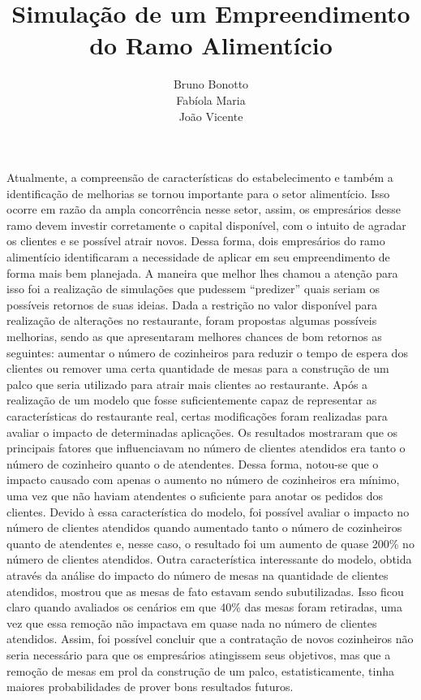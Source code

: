 \documentclass[pt,disc,oneside]{ufscpgeasthesis}
\institute         {}
\title             {Simulação de um Empreendimento do Ramo Alimentício}
\author            {Bruno Bonotto \\ Fabíola Maria \\ João Vicente}
\begin{document}
	\frontpage
	\presentationpage
	\tableofcontents

	\resumo

		Atualmente, a compreensão de características do estabelecimento e também a identificação de melhorias se tornou importante para o setor alimentício.
		Isso ocorre em razão da ampla concorrência nesse setor, assim, os empresários desse ramo devem investir corretamente o capital disponível, com o intuito de agradar os clientes e se possível atrair novos.
		Dessa forma, dois empresários do ramo alimentício identificaram a necessidade de aplicar em seu empreendimento de forma mais bem planejada.
		A maneira que melhor lhes chamou a atenção para isso foi a realização de simulações que pudessem ``predizer'' quais seriam os possíveis retornos de suas ideias.
		Dada a restrição no valor disponível para realização de alterações no restaurante, foram propostas algumas possíveis melhorias, sendo as que apresentaram melhores chances de bom retornos as seguintes: aumentar o número de cozinheiros para reduzir o tempo de espera dos clientes ou remover uma certa quantidade de mesas para a construção de um palco que seria utilizado para atrair mais clientes ao restaurante.
		Após a realização de um modelo que fosse suficientemente capaz de representar as características do restaurante real, certas modificações foram realizadas para avaliar o impacto de determinadas aplicações.
		Os resultados mostraram que os principais fatores que influenciavam no número de clientes atendidos era tanto o número de cozinheiro quanto o de atendentes.
		Dessa forma, notou-se que o impacto causado com apenas o aumento no número de cozinheiros era mínimo, uma vez que não haviam atendentes o suficiente para anotar os pedidos dos clientes.
		Devido à essa característica do modelo, foi possível avaliar o impacto no número de clientes atendidos quando aumentado tanto o número de cozinheiros quanto de atendentes e, nesse caso, o resultado foi um aumento de quase 200\% no número de clientes atendidos.
		Outra característica interessante do modelo, obtida através da análise do impacto do número de mesas na quantidade de clientes atendidos, mostrou que as mesas de fato estavam sendo subutilizadas.
		Isso ficou claro quando avaliados os cenários em que 40\% das mesas foram retiradas, uma vez que essa remoção não impactava em quase nada no número de clientes atendidos.
		Assim, foi possível concluir que a contratação de novos cozinheiros não seria necessário para que os empresários atingissem seus objetivos, mas que a remoção de mesas em prol da construção de um palco, estatisticamente, tinha maiores probabilidades de prover bons resultados futuros.
\end{document}
